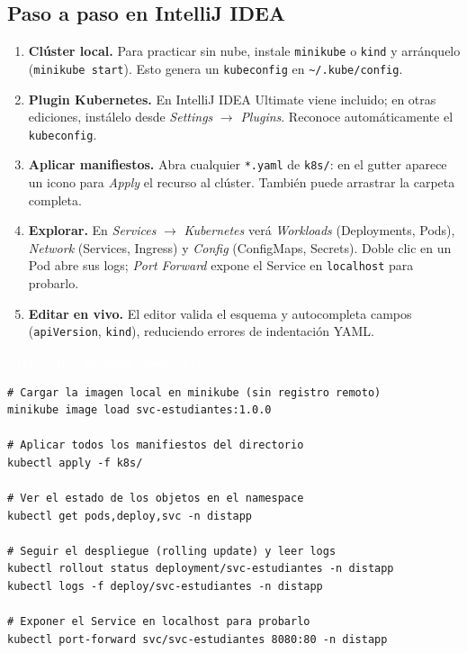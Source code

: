 \documentclass[11pt,a4paper]{article}
\newcommand{\archivo}[1]{\par\vspace{5pt}\noindent\colorbox{uteqBlue}{\textcolor{white}{\small\,\faFileIco\ \texttt{#1}\,}}\par\nopagebreak\vspace{1pt}}
\newcommand{\faFileIco}{\raisebox{-0.1ex}{\scriptsize$\square$}}
\begin{document}
\subsection{Paso a paso en IntelliJ IDEA}

\begin{enumerate}
\item \textbf{Cl\'uster local.} Para practicar sin nube, instale \texttt{minikube} o \texttt{kind} y arr\'anquelo (\texttt{minikube start}). Esto genera un \texttt{kubeconfig} en \texttt{\textasciitilde/.kube/config}.
\item \textbf{Plugin Kubernetes.} En IntelliJ IDEA Ultimate viene incluido; en otras ediciones, inst\'alelo desde \emph{Settings} $\rightarrow$ \emph{Plugins}. Reconoce autom\'aticamente el \texttt{kubeconfig}.
\item \textbf{Aplicar manifiestos.} Abra cualquier \texttt{*.yaml} de \texttt{k8s/}: en el gutter aparece un icono para \emph{Apply} el recurso al cl\'uster. Tambi\'en puede arrastrar la carpeta completa.
\item \textbf{Explorar.} En \emph{Services} $\rightarrow$ \emph{Kubernetes} ver\'a \emph{Workloads} (Deployments, Pods), \emph{Network} (Services, Ingress) y \emph{Config} (ConfigMaps, Secrets). Doble clic en un Pod abre sus logs; \emph{Port Forward} expone el Service en \texttt{localhost} para probarlo.
\item \textbf{Editar en vivo.} El editor valida el esquema y autocompleta campos (\texttt{apiVersion}, \texttt{kind}), reduciendo errores de indentaci\'on YAML.
\end{enumerate}

\archivo{Terminal --- Windows PowerShell}
\begin{lstlisting}[numbers=none]
# Cargar la imagen local en minikube (sin registro remoto)
minikube image load svc-estudiantes:1.0.0

# Aplicar todos los manifiestos del directorio
kubectl apply -f k8s/

# Ver el estado de los objetos en el namespace
kubectl get pods,deploy,svc -n distapp

# Seguir el despliegue (rolling update) y leer logs
kubectl rollout status deployment/svc-estudiantes -n distapp
kubectl logs -f deploy/svc-estudiantes -n distapp

# Exponer el Service en localhost para probarlo
kubectl port-forward svc/svc-estudiantes 8080:80 -n distapp
\end{lstlisting}
\end{document}
